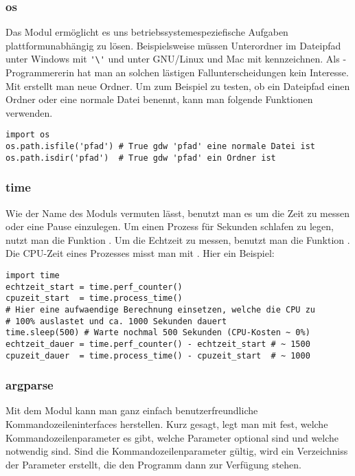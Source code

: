\subsubsection{os}
\label{section:module:empfohlene_module:os}
Das Modul  ermöglicht es uns betriebssystemespeziefische Aufgaben plattformunabhängig zu lösen.
Beispielsweise müssen Unterordner im Dateipfad unter Windows mit \lstinline[style=PyInline]|'\'| und unter GNU/Linux und Mac mit  kennzeichnen.
Als \Python-Programmererin hat man an solchen lästigen Fallunterscheidungen kein Interesse.
Mit  erstellt man neue Ordner.
Um zum Beispiel zu testen, ob ein Dateipfad einen Ordner oder eine normale Datei benennt, kann man folgende Funktionen verwenden.
\begin{lstlisting}
import os
os.path.isfile('pfad') # True gdw 'pfad' eine normale Datei ist
os.path.isdir('pfad')  # True gdw 'pfad' ein Ordner ist
\end{lstlisting}


\subsubsection{time}
\label{section:module:empfohlene_module:time}
Wie der Name des Moduls  vermuten lässt, benutzt man es um die Zeit zu messen oder eine Pause einzulegen.
Um einen Prozess für  Sekunden schlafen zu legen, nutzt man die Funktion .
Um die Echtzeit zu messen, benutzt man die Funktion .
Die CPU-Zeit eines Prozesses misst man mit .
Hier ein Beispiel:
\begin{lstlisting}
import time
echtzeit_start = time.perf_counter()
cpuzeit_start  = time.process_time()
# Hier eine aufwaendige Berechnung einsetzen, welche die CPU zu
# 100% auslastet und ca. 1000 Sekunden dauert
time.sleep(500) # Warte nochmal 500 Sekunden (CPU-Kosten ~ 0%)
echtzeit_dauer = time.perf_counter() - echtzeit_start # ~ 1500
cpuzeit_dauer  = time.process_time() - cpuzeit_start  # ~ 1000
\end{lstlisting}


\subsubsection{argparse}
\label{section:module:empfohlene_module:argparse}
Mit dem Modul  kann man ganz einfach benutzerfreundliche Kommandozeileninterfaces herstellen.
Kurz gesagt, legt man mit  fest, welche Kommandozeilenparameter es gibt, welche Parameter optional sind und welche notwendig sind.
Sind die Kommandozeilenparameter gültig, wird ein Verzeichniss der Parameter erstellt, die den Programm dann zur Verfügung stehen.

